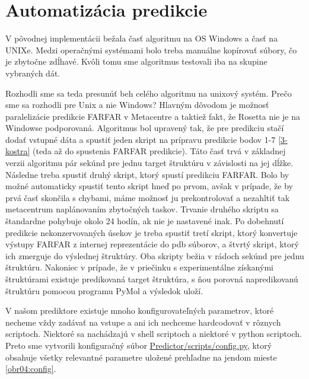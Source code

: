 \section{Automatizácia predikcie}
V pôvodnej implementácii bežala časť algoritmu na OS Windows a časť na UNIXe. Medzi operačnými systémami bolo treba manuálne kopírovať súbory, čo je zbytočne zdĺhavé. Kvôli tomu sme algoritmus testovali iba na skupine vybraných dát. 

\indent Rozhodli sme sa teda presunúť beh celého algoritmu na unixový systém. Prečo sme sa rozhodli pre Unix a nie Windows? Hlavným dôvodom je možnosť paralelizácie predikcie FARFAR v Metacentre a taktiež fakt, že Rosetta nie je na Windowse podporovaná. Algoritmus bol upravený tak, že pre predikciu stačí dodať vstupné dáta a spustiť jeden skript na prípravu predikcie bodov 1-7 \autoref{3-kostra} (teda až do spustenia FARFAR predikcie). Táto časť trvá v základnej verzii algoritmu pár sekúnd pre jednu target štruktúru v závislosti na jej dĺžke.  Následne treba spustiť druhý skript, ktorý spustí predikciu FARFAR. Bolo by možné automaticky spustiť tento skript hneď po prvom, avšak v prípade, že by prvá časť skončila s chybami, máme možnosť ju prekontrolovať a nezahltiť tak metacentrum naplánovaním zbytočných taskov. Trvanie druhého skriptu sa štandardne pohybuje okolo 24 hodín, ak nie je nastavené inak. Po dobehnutí predikcie nekonzervovaných úsekov je treba spustiť tretí skript, ktorý konvertuje výstupy FARFAR z internej reprezentácie do pdb súborov, a štvrtý skript, ktorý ich zmerguje do výslednej štruktúry. Oba skripty bežia v rádoch sekúnd pre jednu štruktúru. Nakoniec v prípade, že v priečinku s experimentálne získanými štruktúrami existuje predikovaná target štruktúra, s ňou porovná napredikovanú štruktúru pomocou programu PyMol a výsledok uloží.


\indent V našom prediktore existuje mnoho konfigurovateľných parametrov, ktoré necheme vždy zadávať na vstupe a ani ich nechceme hardcodovať v rôznych scriptoch. Niektoré sa nachádzajú v shell scriptoch a niektoré v python scriptoch. Preto sme vytvorili konfiguračný súbor \url{Predictor/scripts/config.py}, ktorý obsahuje všetky relevantné parametre uložené prehľadne na jendom mieste \autoref{obr04:config}.

